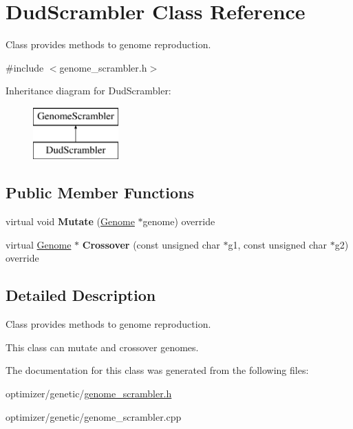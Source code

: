 \hypertarget{class_dud_scrambler}{}\section{Dud\+Scrambler Class Reference}
\label{class_dud_scrambler}


Class provides methods to genome reproduction.  




{\ttfamily \#include $<$genome\+\_\+scrambler.\+h$>$}

Inheritance diagram for Dud\+Scrambler\+:\begin{figure}[H]
\begin{center}
\leavevmode
\includegraphics[height=2.000000cm]{class_dud_scrambler}
\end{center}
\end{figure}
\subsection*{Public Member Functions}
\begin{DoxyCompactItemize}
\item 
\hypertarget{class_dud_scrambler_a2d3f087445f46868d8d12f8fb1f54ee2}{}\label{class_dud_scrambler_a2d3f087445f46868d8d12f8fb1f54ee2} 
virtual void {\bfseries Mutate} (\hyperlink{class_genome}{Genome} $\ast$genome) override
\item 
\hypertarget{class_dud_scrambler_ae08ff0725e1ada6067f69c3a769dfbae}{}\label{class_dud_scrambler_ae08ff0725e1ada6067f69c3a769dfbae} 
virtual \hyperlink{class_genome}{Genome} $\ast$ {\bfseries Crossover} (const unsigned char $\ast$g1, const unsigned char $\ast$g2) override
\end{DoxyCompactItemize}


\subsection{Detailed Description}
Class provides methods to genome reproduction. 

This class can mutate and crossover genomes. 

The documentation for this class was generated from the following files\+:\begin{DoxyCompactItemize}
\item 
optimizer/genetic/\hyperlink{genome__scrambler_8h}{genome\+\_\+scrambler.\+h}\item 
optimizer/genetic/genome\+\_\+scrambler.\+cpp\end{DoxyCompactItemize}
